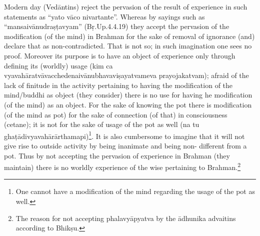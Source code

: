 


Modern day (Vedāntins) reject the pervasion of the result of experience in such statements as “yato vāco nivartante”. Whereas by sayings such as “mansaivānudraṣṭavyam” (Bṛ.Up.4.4.19) they accept the pervasion of the modification (of the mind) in Brahman for the sake of removal of ignorance (and) declare that as non-contradicted. That is not so; in such imagination one sees no proof. Moreover its purpose is to have an object of experience only through defining its (worldly) usage (kim ca vyavahāratvāvacchedenaivānubhavaviṣayatvameva prayojakatvam); afraid of the lack of finitude in the activity pertaining to having the modification of the mind/buddhi as object (they consider) there is no use for having he   modification (of the mind) as an object. For the sake of knowing the pot there is modification (of the mind as pot) for the sake of connection (of that) in consciousness (cetane); it is not for the sake of usage of the pot as well (na tu ghaṭādivyavahārārtha\-mapi)\footnote{One cannot have a modification of the mind regarding the usage of the pot as well.}. It is also cumbersome to imagine that it will not give rise to outside activity by being inanimate and being non- different from a pot. Thus by not accepting the pervasion of experience in Brahman (they maintain) there is no worldly experience of the wise pertaining to Brahman.\footnote{The reason for not accepting phalavyāpyatva by the ādhunika advaitins according to Bhikṣu.} 

